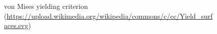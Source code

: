 \begin{itemize}
\begin{figure}[H]
\caption{von Mises yielding criterion (\href{https://upload.wikimedia.org/wikipedia/commons/c/cc/Yield_surfaces.svg}{\url{https://upload.wikimedia.org/wikipedia/commons/c/cc/Yield_surfaces.svg}})}
\end{figure}
\end{itemize}
